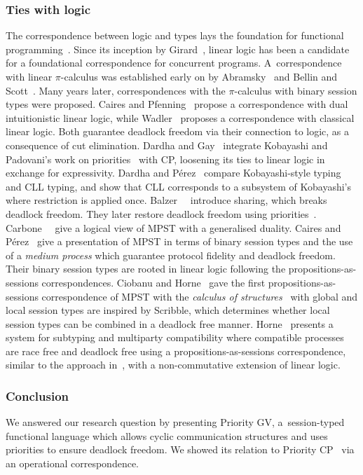 \documentclass[main.tex]{subfiles}
\begin{document}
\subsubsection*{Ties with logic}
The correspondence between logic and types lays the foundation for functional programming~\cite{wadler15}.
Since its inception by Girard~\cite{girard87}, linear logic has been a candidate for a foundational correspondence for concurrent programs.
A~correspondence with linear $\pi$-calculus was established early on by Abramsky~\cite{abramsky94} and Bellin and Scott~\cite{bellinscott94}. Many years later, correspondences with the $\pi$-calculus with binary session types were proposed. Caires and Pfenning~\cite{cairespfenning10} propose a correspondence with dual intuitionistic linear logic, while Wadler~\cite{wadler14} proposes a correspondence with classical linear logic. Both guarantee deadlock freedom via their connection to logic, as a consequence of cut elimination.
Dardha and Gay~\cite{dardhagay18} integrate Kobayashi and Padovani's work on priorities~\cite{kobayashi06,padovani14} with CP, loosening its ties to linear logic in exchange for expressivity.
Dardha and P\'{e}rez~\cite{dardhaperez15} compare Kobayashi-style typing and CLL typing, and show that CLL corresponds to a subsystem of Kobayashi's where restriction is applied once.
Balzer~\etal~\cite{balzerpfenning17} introduce sharing, which breaks deadlock freedom.
They later restore deadlock freedom using priorities~\cite{balzertoninho19}.
Carbone~\etal~\cite{CarboneMSY15,carbonelindley16} give a logical view of MPST with a generalised duality.
Caires and P\'{e}rez~\cite{CairesP16} give a presentation of MPST in terms of binary session types and the use of a \emph{medium process} which guarantee protocol fidelity and deadlock freedom.
Their binary session types are rooted in linear logic following the propositions-as-sessions correspondences.
Ciobanu and Horne~\cite{CiobanuH15} gave the first propositions-as-sessions correspondence of MPST with the \emph{calculus of structures}~\cite{Guglielmi07} with global and local session types are inspired by Scribble, which determines whether local session types can be combined in a deadlock free manner.
Horne~\cite{Horne20} presents a system for subtyping and multiparty compatibility where compatible processes are race free and deadlock free using a propositions-as-sessions correspondence, similar to the approach in~\cite{CiobanuH15}, with a non-commutative extension of linear logic.

\subsubsection*{Conclusion}
We answered our research question by presenting Priority GV, a~session-typed functional language which allows cyclic communication structures and uses priorities to ensure deadlock freedom. We showed its relation to Priority CP~\cite{dardhagay18} via an operational correspondence.
\end{document}
